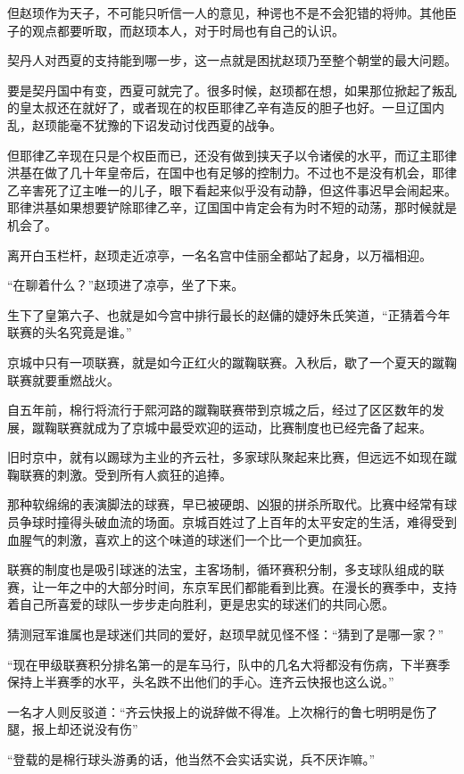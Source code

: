 但赵顼作为天子，不可能只听信一人的意见，种谔也不是不会犯错的将帅。其他臣子的观点都要听取，而赵顼本人，对于时局也有自己的认识。

契丹人对西夏的支持能到哪一步，这一点就是困扰赵顼乃至整个朝堂的最大问题。

要是契丹国中有变，西夏可就完了。很多时候，赵顼都在想，如果那位掀起了叛乱的皇太叔还在就好了，或者现在的权臣耶律乙辛有造反的胆子也好。一旦辽国内乱，赵顼能毫不犹豫的下诏发动讨伐西夏的战争。

但耶律乙辛现在只是个权臣而已，还没有做到挟天子以令诸侯的水平，而辽主耶律洪基在做了几十年皇帝后，在国中也有足够的控制力。不过也不是没有机会，耶律乙辛害死了辽主唯一的儿子，眼下看起来似乎没有动静，但这件事迟早会闹起来。耶律洪基如果想要铲除耶律乙辛，辽国国中肯定会有为时不短的动荡，那时候就是机会了。

离开白玉栏杆，赵顼走近凉亭，一名名宫中佳丽全都站了起身，以万福相迎。

“在聊着什么？”赵顼进了凉亭，坐了下来。

生下了皇第六子、也就是如今宫中排行最长的赵傭的婕妤朱氏笑道，“正猜着今年联赛的头名究竟是谁。”

京城中只有一项联赛，就是如今正红火的蹴鞠联赛。入秋后，歇了一个夏天的蹴鞠联赛就要重燃战火。

自五年前，棉行将流行于熙河路的蹴鞠联赛带到京城之后，经过了区区数年的发展，蹴鞠联赛就成为了京城中最受欢迎的运动，比赛制度也已经完备了起来。

旧时京中，就有以踢球为主业的齐云社，多家球队聚起来比赛，但远远不如现在蹴鞠联赛的刺激。受到所有人疯狂的追捧。

那种软绵绵的表演脚法的球赛，早已被硬朗、凶狠的拼杀所取代。比赛中经常有球员争球时撞得头破血流的场面。京城百姓过了上百年的太平安定的生活，难得受到血腥气的刺激，喜欢上的这个味道的球迷们一个比一个更加疯狂。

联赛的制度也是吸引球迷的法宝，主客场制，循环赛积分制，多支球队组成的联赛，让一年之中的大部分时间，东京军民们都能看到比赛。在漫长的赛季中，支持着自己所喜爱的球队一步步走向胜利，更是忠实的球迷们的共同心愿。

猜测冠军谁属也是球迷们共同的爱好，赵顼早就见怪不怪：“猜到了是哪一家？”

“现在甲级联赛积分排名第一的是车马行，队中的几名大将都没有伤病，下半赛季保持上半赛季的水平，头名跌不出他们的手心。连齐云快报也这么说。”

一名才人则反驳道：“齐云快报上的说辞做不得准。上次棉行的鲁七明明是伤了腿，报上却还说没有伤”

“登载的是棉行球头游勇的话，他当然不会实话实说，兵不厌诈嘛。”

